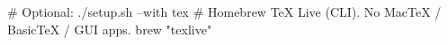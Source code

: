 # Optional: ./setup.sh --with tex
# Homebrew TeX Live (CLI). No MacTeX / BasicTeX / GUI apps.
brew "texlive"
